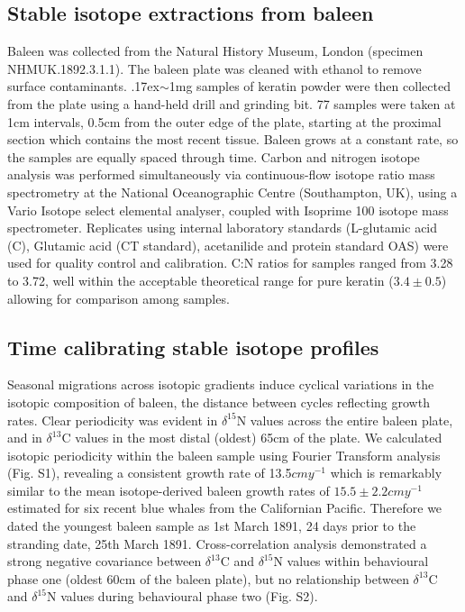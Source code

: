 \documentclass[a4paper,12pt]{article}
\begin{document}
\subsection{Stable isotope extractions from baleen}
Baleen was collected from the Natural History Museum, London (specimen NHMUK.1892.3.1.1). 
The baleen plate was cleaned with ethanol to remove surface contaminants. 
{\raise.17ex\hbox{$\scriptstyle\sim$}}1mg samples of keratin powder were then collected from the plate using a hand-held drill and grinding bit. 
77 samples were taken at 1cm intervals, 0.5cm from the outer edge of the plate, starting at the proximal section which contains the most recent tissue. 
Baleen grows at a constant rate, so the samples are equally spaced through time\cite{best1996stable}. Carbon and nitrogen isotope analysis was performed simultaneously via continuous-flow isotope ratio mass spectrometry at the National Oceanographic Centre (Southampton, UK), using a Vario Isotope select elemental analyser, coupled with Isoprime 100 isotope mass spectrometer. 
Replicates using internal laboratory standards (L-glutamic acid (C), Glutamic acid (CT standard), acetanilide and protein standard OAS) were used for quality control and calibration. 
C:N ratios for samples ranged from 3.28\text{\textperthousand} to 3.72\text{\textperthousand}, well within the acceptable theoretical range for pure keratin ($3.4\pm0.5$) allowing for comparison among samples\cite{hobson1998stable}. 
 
\subsection{Time calibrating stable isotope profiles}
Seasonal migrations across isotopic gradients induce cyclical variations in the isotopic composition of baleen, the distance between cycles reflecting growth rates\cite{hobson1998stable,busquets2017estimating}. 
Clear periodicity was evident in $\delta^{15}$N values across the entire baleen plate, and in $\delta^{13}$C values in the most distal (oldest) 65cm of the plate. 
We calculated isotopic periodicity within the baleen sample using Fourier Transform analysis\cite{cardona2017temporal} (Fig. S1), revealing a consistent growth rate of 13.5$cmy^{-1}$ which is remarkably similar to the mean isotope-derived baleen growth rates of $15.5 \pm 2.2cmy^{-1}$ estimated for six recent blue whales from the Californian Pacific\cite{busquets2017estimating}.  
Therefore we dated the youngest baleen sample as 1st March 1891, 24 days prior to the stranding date, 25th March 1891. 
Cross-correlation analysis demonstrated a strong negative covariance between $\delta^{13}$C and $\delta^{15}$N values within behavioural phase one (oldest 60cm of the baleen plate), but no relationship between $\delta^{13}$C and $\delta^{15}$N values during behavioural phase two (Fig. S2).
 
\end{document}

